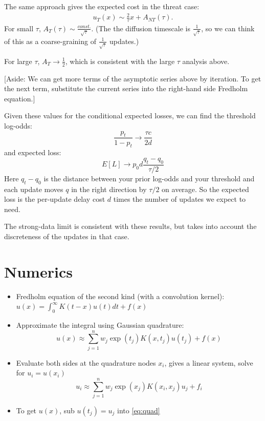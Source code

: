 \documentclass[12pt, letterpaper]{article}
\begin{document}
The same approach gives the expected cost in the threat case:
\begin{align}
    u_{T}(x) \sim \frac{2}{\tau} x + A_{NT}(\tau).
\end{align}
For small $\tau$, $A_{T}(\tau) \sim \frac{const.}{\sqrt{\tau}}$.
(The the diffusion timescale is $\frac{1}{\sqrt{\tau}}$, so we can think of this as a coarse-graining of $\frac{1}{\sqrt{\tau}}$ updates.)

For large $\tau$, $A_{T} \to \frac{1}{2}$, which is consistent with the large $\tau$ analysis above.

[Aside: We can get more terms of the asymptotic series above by iteration. To get the next term, substitute the current series into the right-hand side Fredholm equation.]

Given these values for the conditional expected losses, we can find the threshold log-odds:
\begin{equation}\frac{p_t}{1 - p_t} \to \frac{\tau c}{2 d}\end{equation}
and expected loss:
\begin{equation}E[L] \to p_0 d \frac{q_t - q_0}{\tau / 2}\end{equation}
Here $q_t - q_0$ is the distance between your prior log-odds and your threshold and each update moves $q$ in the right direction by $\tau / 2$ on average.
So the expected loss is the per-update delay cost $d$ times the number of updates we expect to need.

The strong-data limit is consistent with these results, but takes into account the discreteness of the updates in that case.

\section{Numerics}

\begin{itemize}
    \item Fredholm equation of the second kind (with a convolution kernel): $u(x) = \int_{0}^{\infty} K(t-x) u(t) dt + f(x)$
    \item Approximate the integral using Gaussian quadrature: 
        \begin{equation}
            u(x) \approx \sum_{j=1}^{n} w_j \exp(t_j) K(x, t_j) u(t_j) + f(x) \label{eq:quad}
        \end{equation}
    \item Evaluate both sides at the quadrature nodes $x_i$, gives a linear system, solve for $u_i = u(x_i)$
        \begin{equation}
            u_i \approx \sum_{j=1}^{n} w_j \exp(x_j) K(x_i, x_j) u_j + f_i
        \end{equation}
    \item To get $u(x)$, sub $u(t_j) = u_j$ into \ref{eq:quad}
\end{itemize}
\end{document}
